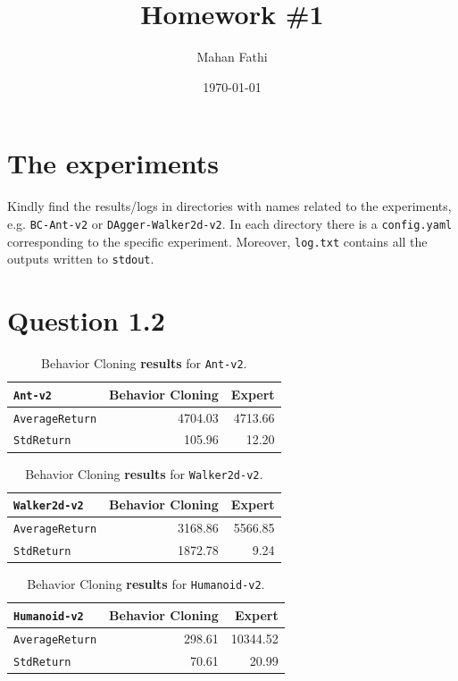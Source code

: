 \documentclass[11pt]{article}
\author{Mahan Fathi}
\date{\today}
\title{Homework \#1}
\begin{document}
\maketitle

\section{The experiments}
\label{sec:org8a0c8f7}
Kindly find the results/logs in directories with names related to the experiments, e.g. \texttt{BC-Ant-v2} or \texttt{DAgger-Walker2d-v2}. In each directory there is a \texttt{config.yaml} corresponding to the specific experiment. Moreover, \texttt{log.txt} contains all the outputs written to \texttt{stdout}.

\section{Question 1.2}
\label{sec:orga36ef4c}
\begin{table}[htbp]
\caption[BC for \texttt{Ant-v2}]{Behavior Cloning \textbf{\textbf{results}} for \texttt{Ant-v2}.}
\centering
\begin{tabular}{l|r|r}
\texttt{Ant-v2} & Behavior Cloning & Expert\\
\hline
\texttt{AverageReturn} & 4704.03 & 4713.66\\
\hline
\texttt{StdReturn} & 105.96 & 12.20\\
\end{tabular}
\end{table}

\begin{table}[htbp]
\caption[BC for \texttt{Ant-v2}]{Behavior Cloning \textbf{\textbf{results}} for \texttt{Walker2d-v2}.}
\centering
\begin{tabular}{l|r|r}
\texttt{Walker2d-v2} & Behavior Cloning & Expert\\
\hline
\texttt{AverageReturn} & 3168.86 & 5566.85\\
\hline
\texttt{StdReturn} & 1872.78 & 9.24\\
\end{tabular}
\end{table}

\begin{table}[htbp]
\caption[BC for \texttt{Ant-v2}]{Behavior Cloning \textbf{\textbf{results}} for \texttt{Humanoid-v2}.}
\centering
\begin{tabular}{l|r|r}
\texttt{Humanoid-v2} & Behavior Cloning & Expert\\
\hline
\texttt{AverageReturn} & 298.61 & 10344.52\\
\hline
\texttt{StdReturn} & 70.61 & 20.99\\
\end{tabular}
\end{table}
\end{document}

